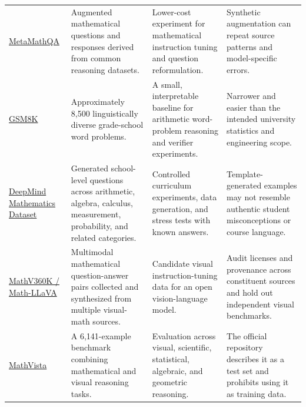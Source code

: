 \documentclass[11pt]{article}
\begin{document}
\begin{longtable}{@{}P{0.19\textwidth}P{0.27\textwidth}P{0.27\textwidth}P{0.19\textwidth}@{}}
\addlinespace
\href{https://huggingface.co/datasets/meta-math/MetaMathQA}{MetaMathQA} \cite{metamath} & Augmented mathematical questions and responses derived from common reasoning datasets. & Lower-cost experiment for mathematical instruction tuning and question reformulation. & Synthetic augmentation can repeat source patterns and model-specific errors. \\
\addlinespace
\href{https://github.com/openai/grade-school-math}{GSM8K} \cite{gsm8k} & Approximately 8,500 linguistically diverse grade-school word problems. & A small, interpretable baseline for arithmetic word-problem reasoning and verifier experiments. & Narrower and easier than the intended university statistics and engineering scope. \\
\addlinespace
\href{https://github.com/google-deepmind/mathematics_dataset}{DeepMind Mathematics Dataset} \cite{deepmindmath} & Generated school-level questions across arithmetic, algebra, calculus, measurement, probability, and related categories. & Controlled curriculum experiments, data generation, and stress tests with known answers. & Template-generated examples may not resemble authentic student misconceptions or course language. \\
\addlinespace
\href{https://github.com/HZQ950419/Math-LLaVA}{MathV360K / Math-LLaVA} \cite{mathllava} & Multimodal mathematical question-answer pairs collected and synthesized from multiple visual-math sources. & Candidate visual instruction-tuning data for an open vision-language model. & Audit licenses and provenance across constituent sources and hold out independent visual benchmarks. \\
\addlinespace
\href{https://github.com/lupantech/MathVista}{MathVista} \cite{mathvista} & A 6,141-example benchmark combining mathematical and visual reasoning tasks. & Evaluation across visual, scientific, statistical, algebraic, and geometric reasoning. & The official repository describes it as a test set and prohibits using it as training data. \\
\bottomrule
\end{longtable}
\end{document}
